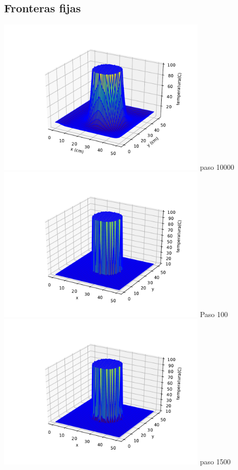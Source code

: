 \documentclass[12pt]{article}
\begin{document}
\begin{centering}

\subsection{Fronteras fijas}
\includegraphics[width=0.75\textwidth]{3d2.pdf}
paso 10000
\\
\includegraphics[width=0.75\textwidth]{3d3.pdf}
Paso 100
\\
\includegraphics[width=0.75\textwidth]{3d4.pdf}
paso 1500

\end{centering}
\end{document}
